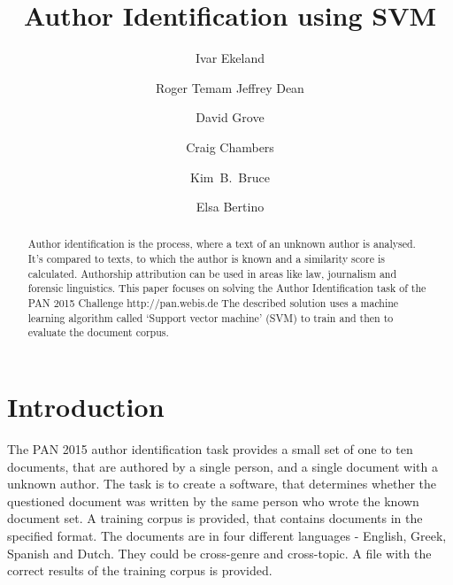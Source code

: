 \documentclass{llncs}
\begin{document}
\title{Author Identification using SVM}
%
%
\author{Ivar Ekeland \and Roger Temam
Jeffrey Dean \and David Grove \and Craig Chambers \and Kim~B.~Bruce \and
Elsa Bertino}
%
%
%

\maketitle              %

\begin{abstract}
\noindent Author identification is the process, where a text of an unknown author is analysed. It's compared to texts, to which the author is known and a similarity score is calculated. Authorship attribution can be used in areas like law, journalism and forensic linguistics. This paper focuses on solving the Author Identification \cite{stamatatos:2015} task of the PAN 2015 Challenge  http://pan.webis.de 
The described solution uses a machine learning algorithm called `Support vector machine' (SVM) to train and then to evaluate the document corpus.

\end{abstract}
%

\section{Introduction}

The PAN 2015 author identification task provides a small set of one to ten documents, that are authored by a single person, and a single document with a unknown author. The task is to create a software, that determines whether the questioned document was written by the same person who wrote the known document set.
A training corpus is provided, that contains documents in the specified format. The documents are in four different languages - English, Greek, Spanish and Dutch.  They could be cross-genre and cross-topic. A file with the correct results of the training corpus is provided.
\end{document}
